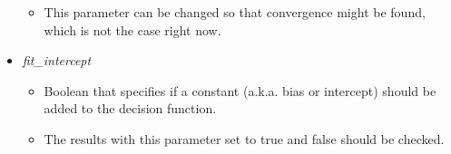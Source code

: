 \begin{itemize}
\begin{itemize}
        \item This parameter can be changed so that convergence might be found, which is not the case right now.
    \end{itemize}
    \item \emph{fit\_intercept}
    \begin{itemize}
        \item Boolean that specifies if a constant (a.k.a. bias or intercept) should be added to the decision function.
        \item The results with this parameter set to true and false should be checked.
    \end{itemize}
\end{itemize}

